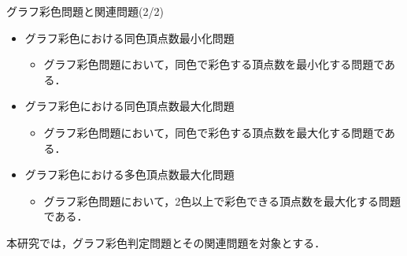 \documentclass[dvipdfmx,11pt]{beamer}
\begin{document}
\begin{frame}{グラフ彩色問題と関連問題(2/2)}

 \begin{itemize}
  \item \alert{グラフ彩色における同色頂点数最小化問題}
        \begin{itemize}
         \item グラフ彩色問題において，同色で彩色する頂点数を最小化する問題である．
        \end{itemize}
  \item \alert{グラフ彩色における同色頂点数最大化問題}
        \begin{itemize}
         \item グラフ彩色問題において，同色で彩色する頂点数を最大化する問題である．
        \end{itemize}
  \item \alert{グラフ彩色における多色頂点数最大化問題}
        \begin{itemize}
         \item グラフ彩色問題において，2色以上で彩色できる頂点数を最大化する問題である．
        \end{itemize}
 \end{itemize}
 
 \begin{alertblock}{}
  本研究では，グラフ彩色判定問題とその関連問題を対象とする．
 \end{alertblock}
 
\end{frame}

\end{document}
